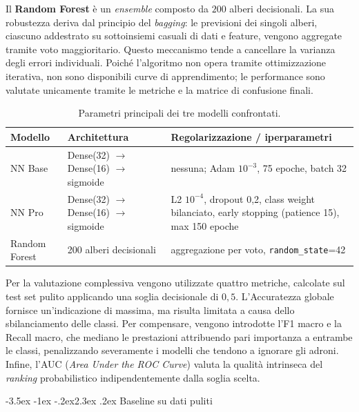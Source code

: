 \documentclass[12pt,a4paper]{article}
\makeatletter
\renewcommand\section{\@startsection{section}{1}{\z@}%
  {-3.5ex \@plus -1ex \@minus -.2ex}{2.3ex \@plus.2ex}%
  {\normalfont\Large\bfseries}}
\makeatother
\begin{document}
Il \textbf{Random Forest} è un \textit{ensemble} composto da $200$ alberi 
decisionali. La sua robustezza deriva dal principio del \textit{bagging}: le 
previsioni dei singoli alberi, ciascuno addestrato su sottoinsiemi casuali di 
dati e feature, vengono aggregate tramite voto maggioritario. Questo meccanismo 
tende a cancellare la varianza degli errori individuali. Poiché l'algoritmo non 
opera tramite ottimizzazione iterativa, non sono disponibili curve di 
apprendimento; le performance sono valutate unicamente tramite le metriche e la 
matrice di confusione finali.

\begin{table}[H]\centering\small
\caption{Parametri principali dei tre modelli confrontati.}\label{tab:modelli}
\begin{tabular}{@{}l p{4.6cm} p{6.8cm}@{}}
\toprule
\textbf{Modello} & \textbf{Architettura} & \textbf{Regolarizzazione / iperparametri} \\
\midrule
NN Base & Dense(32) $\to$ Dense(16) $\to$ sigmoide & nessuna; Adam $10^{-3}$, 75 epoche, batch 32 \\[4pt]
NN Pro & Dense(32) $\to$ Dense(16) $\to$ sigmoide & L2 $10^{-4}$, dropout 0,2, class weight bilanciato, early stopping (patience 15), max 150 epoche \\[4pt]
Random Forest & 200 alberi decisionali & aggregazione per voto, \texttt{random\_state}=42 \\
\bottomrule
\end{tabular}
\end{table}

Per la valutazione complessiva vengono utilizzate quattro metriche, calcolate sul 
test set pulito applicando una soglia decisionale di $0{,}5$. L'Accuratezza 
globale fornisce un'indicazione di massima, ma risulta limitata a causa dello 
sbilanciamento delle classi. Per compensare, vengono introdotte l'F1 macro e la 
Recall macro, che mediano le prestazioni attribuendo pari importanza a entrambe 
le classi, penalizzando severamente i modelli che tendono a ignorare gli adroni. 
Infine, l'AUC (\textit{Area Under the ROC Curve}) valuta la qualità intrinseca 
del \textit{ranking} probabilistico indipendentemente dalla soglia scelta.

\section{Baseline su dati puliti}\label{sec:baseline}
\end{document}

